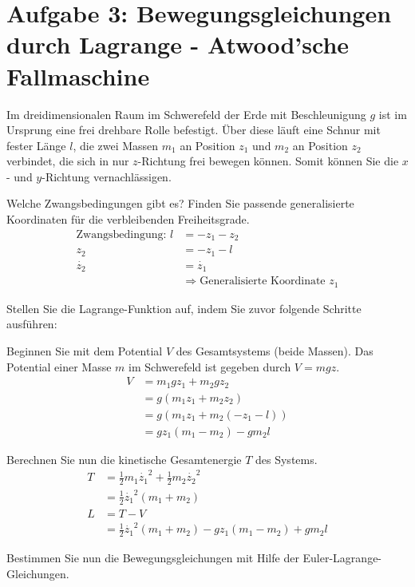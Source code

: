 \section*{Aufgabe 3: Bewegungsgleichungen durch Lagrange - Atwood'sche Fallmaschine}
Im dreidimensionalen Raum im Schwerefeld der Erde mit Beschleunigung $g$ ist im Ursprung eine frei drehbare Rolle befestigt. Über diese läuft eine Schnur mit fester Länge $l$, die zwei Massen $m_1$ an Position $z_1$ und $m_2$ an Position $z_2$ verbindet, die sich in nur $z$-Richtung frei bewegen können.  Somit können Sie die $x$- und $y$-Richtung vernachlässigen.
\begin{enumeralph}
	\item Welche Zwangsbedingungen gibt es?  Finden Sie passende generalisierte Koordinaten für die verbleibenden Freiheitsgrade.
	\begin{align*}
	\text{Zwangsbedingung: }l &= -z_1 -z_2\\
	z_2&=-z_1-l\\
	\dot{z_2}&=\dot{z_1}\\
	&\Rightarrow \text{Generalisierte Koordinate }z_1
	\end{align*}
	\item Stellen Sie die Lagrange-Funktion auf, indem Sie zuvor folgende Schritte ausführen:
	\begin{enumeroman}
		\item Beginnen Sie mit dem Potential $V$ des Gesamtsystems (beide Massen).  Das Potential einer Masse $m$ im Schwerefeld ist gegeben durch $V=mgz$.
		\begin{align*}
		V&=m_1gz_1+m_2gz_2\\
		&=g(m_1z_1+m_2z_2)\\
		&=g(m_1z_1+m_2(-z_1-l))\\
		&=gz_1(m_1-m_2)-gm_2l
		\end{align*}
		\item Berechnen Sie nun die kinetische Gesamtenergie $T$ des Systems.
		\begin{align*}
		T&=\frac{1}{2}m_1\dot{z_1}^2+\frac{1}{2}m_2\dot{z_2}^2\\
		&=\frac{1}{2}\dot{z_1}^2(m_1+m_2)\\
		L&=T-V\\
		&=\frac{1}{2}\dot{z_1}^2(m_1+m_2) -gz_1(m_1-m_2)+gm_2l
		\end{align*}
	\end{enumeroman}
\item Bestimmen Sie nun die Bewegungsgleichungen mit Hilfe der Euler-Lagrange-Gleichungen.

\end{enumeralph}
